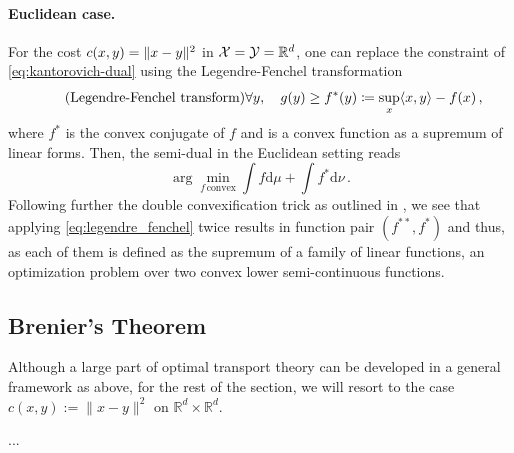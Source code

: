 \paragraph{Euclidean case.} For the cost $c(x, y) = \lVert x-y\rVert^2$ in ${\mathcal{X}} = {\mathcal{Y}} = \mathbb{R}^d$, one can replace the constraint of \eqref{eq:kantorovich-dual} using the Legendre-Fenchel transformation
\begin{equation} \label{eq:legendre_fenchel}
	\tag{Legendre-Fenchel transform}
	\forall y, \quad g(y) \geq f^*(y) \coloneqq \sup _x\langle x, y\rangle-f(x)\,,
\end{equation}
where $f^*$ is the convex conjugate of $f$ and is a convex function as a supremum of linear forms. Then, the semi-dual in the Euclidean setting reads
\begin{equation} \label{eq:dual-cvx}
	\arg\!\!\min_{f\, \text{convex}} \int f \textrm{d}\mu + \int f^*\textrm{d}\nu\,.
\end{equation}
Following further the double convexification trick as outlined in \citet[Lemma 2.10]{villani2021topics}, we see that applying \eqref{eq:legendre_fenchel} twice results in function pair $(f^{**},f^{*})$ and thus,  as each of them is defined as the supremum of a family of linear functions, an optimization problem over two convex lower semi-continuous functions.

\subsection{Brenier's Theorem} \label{sec:background_brenier}

Although a large part of optimal transport theory can be developed in a general framework as above, for the rest of the section, we will resort to the case $c(x, y):=\|x-y\|^2$ on $\mathbb{R}^d \times \mathbb{R}^d$.
\citep{mccann2001polar} \citep{knott1984optimal}

\begin{theorem}
	...
\end{theorem}

